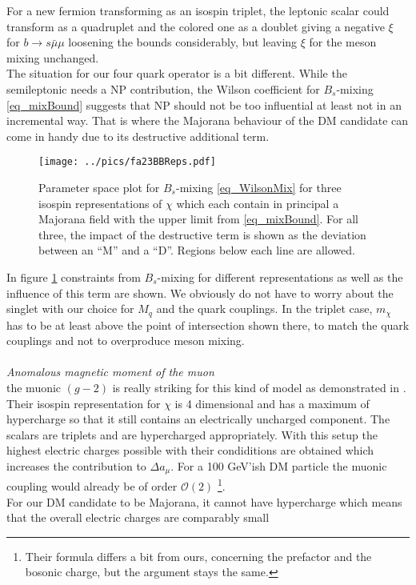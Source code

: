 For a new fermion transforming as an isospin triplet, the leptonic scalar could transform as a quadruplet and the colored one as a doublet giving
a negative $\xi$ for  $b\rightarrow s\bar\mu\mu$  loosening the bounds considerably, but leaving $\xi$ for the meson mixing unchanged.\\
\noindent The situation for our four quark operator is a bit different. While the semileptonic needs a NP contribution, the Wilson coefficient 
for $B_s$-mixing \eqref{eq_mixBound} suggests that NP should not be too influential at least not in an incremental way. That is where the Majorana
behaviour of the DM candidate can come in handy due to its destructive additional term. 
\begin{figure}[t]
 \texttt{[image: ../pics/fa23BBReps.pdf]}
 \caption{Parameter space plot for $B_s$-mixing \eqref{eq_WilsonMix} for three isospin representations of $\chi$ which each contain in principal a 
 Majorana field with the upper limit from \eqref{eq_mixBound}. For all three, the impact of the destructive term is shown as the deviation between
 an ``M'' and a ``D''. Regions below each line are allowed.}
 \label{pic_BsMixRepsMajorana}
\end{figure}
In figure \ref{pic_BsMixRepsMajorana} constraints from $B_s$-mixing for different representations as well as the influence of this term are shown.
We obviously do not have to worry about the singlet with our choice for $M_q$ and the quark couplings. In the triplet case, $m_\chi$ has to be at
least above the point of intersection shown there, to match the quark couplings and not to overproduce meson mixing.
\\ \\ \textit{Anomalous magnetic moment of the muon}\\
\noindent the muonic $(g-2)$ is really striking for this kind of model as demonstrated in \cite{Grip}. Their isospin representation for $\chi$ is
4 dimensional and has a maximum of hypercharge so that it still contains an electrically uncharged component. The scalars are triplets and 
are hypercharged appropriately. With this setup the highest electric charges possible with their condiditions are obtained which increases the 
contribution to $\Delta a_\mu$. For a 100 GeV'ish DM particle the muonic coupling would already be of order $\mathcal{O}(2)$ \footnote{Their 
formula differs a bit from ours, concerning the prefactor and the bosonic charge, but the argument stays the same.}.\\
\noindent For our DM candidate to be Majorana, it cannot have hypercharge which means that the overall electric charges are comparably small
